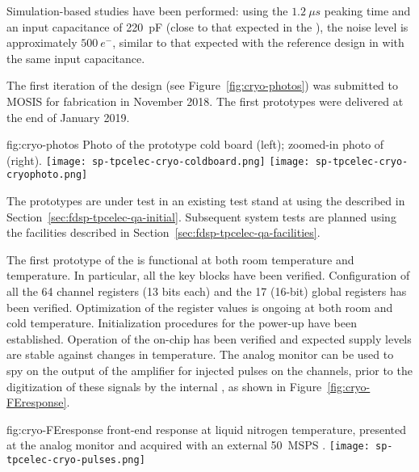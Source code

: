 Simulation-based studies have been performed: using the $\SI{1.2}{{\mu}s}$ peaking time and an 
input capacitance of \SI{220}{pF} (close to that expected in the ), the noise 
level is approximately $\SI{500}{e^{-}}$, similar to that expected with the reference 
 design in  with the same input capacitance.

The first iteration of the   design (see Figure~\ref{fig:cryo-photos}) 
was submitted to MOSIS for fabrication in November 2018. The first prototypes were 
delivered at the end of January 2019.

\begin{dunefigure}
{fig:cryo-photos}
{Photo of the prototype  cold board (left); zoomed-in photo of   (right).}
\texttt{[image: sp-tpcelec-cryo-coldboard.png]}
\hspace{1cm}
\texttt{[image: sp-tpcelec-cryo-cryophoto.png]}
\end{dunefigure}

The prototypes are under test in an existing test stand at  using the 
described in Section~\ref{sec:fdsp-tpcelec-qa-initial}. Subsequent system tests are planned 
using the facilities described in Section~\ref{sec:fdsp-tpcelec-qa-facilities}.

The first prototype of the  is functional at both room temperature and \lntwo 
temperature. In particular, all the key blocks have been verified. Configuration of all the 
64 channel registers (13 bits each) and the 17 (16-bit) global registers has been 
verified. Optimization of the register values is ongoing at both room and cold temperature.
Initialization procedures for the  power-up have been established. 
Operation of the on-chip  has been verified and expected supply levels are 
stable against changes in temperature. The analog monitor can be used to spy on 
the output of the amplifier for injected pulses on the  channels, prior
to the digitization of these signals by the internal , as shown in
Figure~\ref{fig:cryo-FEresponse}.

\begin{dunefigure}
{fig:cryo-FEresponse}
{  front-end response at liquid nitrogen temperature, presented at 
the analog monitor and acquired with an external \SI{50}{MSPS} .}
\texttt{[image: sp-tpcelec-cryo-pulses.png]}
\end{dunefigure}


